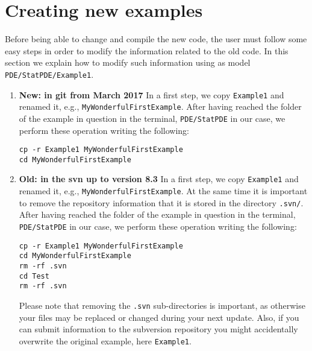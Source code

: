 \section{Creating new examples}
\label{getting_started}
Before being able to change and compile the new code, the user must 
follow some easy steps in order to modify the information related to the old code. In 
this section we explain how to modify such information using as model 
\texttt{PDE/StatPDE/Example1}.

\begin{enumerate}
\item \textbf{New: in git from March 2017} In a first step, we copy \texttt{Example1} and renamed it, e.g., 
\texttt{MyWonderfulFirstExample}. 
After having reached the folder of the example in question in the terminal, 
\texttt{PDE/StatPDE} in our case, we perform these operation writing the following:
\begin{verbatim}
cp -r Example1 MyWonderfulFirstExample
cd MyWonderfulFirstExample
\end{verbatim}


 \item \textbf{Old: in the svn up to version 8.3} In a first step, we copy \texttt{Example1} and renamed it, e.g., 
\texttt{MyWonderfulFirstExample}. At the same time it is important to remove the repository 
information that it is stored in the directory \texttt{.svn/}. \\
After having reached the folder of the example in question in the terminal, 
\texttt{PDE/StatPDE} in our case, we perform these operation writing the following:
\begin{verbatim}
cp -r Example1 MyWonderfulFirstExample
cd MyWonderfulFirstExample
rm -rf .svn
cd Test
rm -rf .svn
\end{verbatim}
Please note that removing the \texttt{.svn} sub-directories is important,
as otherwise your files may be replaced or changed during your next
update. Also, if you can submit information to the subversion repository 
you might accidentally overwrite the original example, here \texttt{Example1}.


\end{enumerate}

